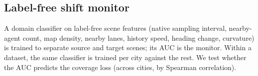 \subsection{Label-free shift monitor}
A domain classifier on label-free scene features (native sampling interval, nearby-agent count, map density, nearby
lanes, history speed, heading change, curvature) is trained to separate source and target scenes; its AUC is the monitor.
Within a dataset, the same classifier is trained per city against the rest. We test whether the AUC predicts the coverage loss
(across cities, by Spearman correlation).

